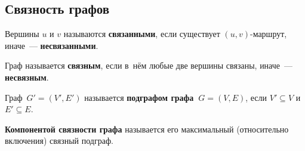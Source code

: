 \subsection{Связность графов}
Вершины $u$ и $v$ называются \textbf{связанными}, если существует $(u, v)$-маршрут, иначе~--- \textbf{несвязанными}.

 Граф называется \textbf{связным}, если в~нём любые две вершины связаны, иначе~--- \textbf{несвязным}.

Граф~$G' = (V', E')$ называется \textbf{подграфом графа~$G = (V, E)$}, если $V' \subseteq V$ и $E' \subseteq E$.

 \textbf{Компонентой связности графа} называется его максимальный (относительно включения) связный подграф.